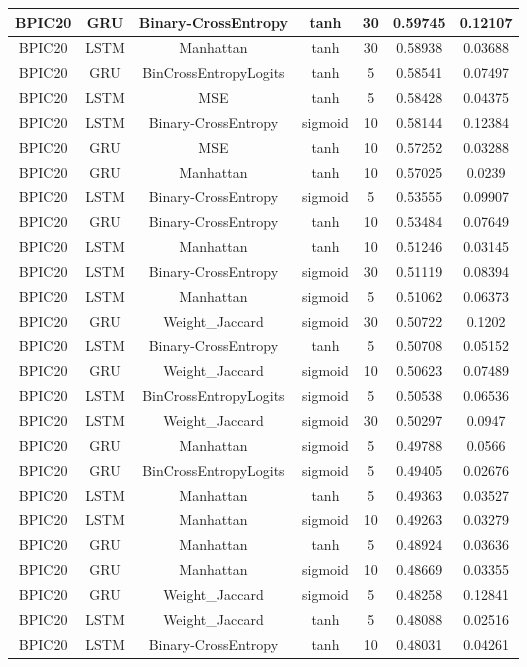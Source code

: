 \documentclass{article}%
\begin{document}
\begin{longtable}{|c|c|c|c|c|c|c|}
\hline%
BPIC20&GRU&Binary{-}CrossEntropy&tanh&30&0.59745&0.12107\\%
\hline%
BPIC20&LSTM&Manhattan&tanh&30&0.58938&0.03688\\%
\hline%
BPIC20&GRU&BinCrossEntropyLogits&tanh&5&0.58541&0.07497\\%
\hline%
BPIC20&LSTM&MSE&tanh&5&0.58428&0.04375\\%
\hline%
BPIC20&LSTM&Binary{-}CrossEntropy&sigmoid&10&0.58144&0.12384\\%
\hline%
BPIC20&GRU&MSE&tanh&10&0.57252&0.03288\\%
\hline%
BPIC20&GRU&Manhattan&tanh&10&0.57025&0.0239\\%
\hline%
BPIC20&LSTM&Binary{-}CrossEntropy&sigmoid&5&0.53555&0.09907\\%
\hline%
BPIC20&GRU&Binary{-}CrossEntropy&tanh&10&0.53484&0.07649\\%
\hline%
BPIC20&LSTM&Manhattan&tanh&10&0.51246&0.03145\\%
\hline%
BPIC20&LSTM&Binary{-}CrossEntropy&sigmoid&30&0.51119&0.08394\\%
\hline%
BPIC20&LSTM&Manhattan&sigmoid&5&0.51062&0.06373\\%
\hline%
BPIC20&GRU&Weight\_Jaccard&sigmoid&30&0.50722&0.1202\\%
\hline%
BPIC20&LSTM&Binary{-}CrossEntropy&tanh&5&0.50708&0.05152\\%
\hline%
BPIC20&GRU&Weight\_Jaccard&sigmoid&10&0.50623&0.07489\\%
\hline%
BPIC20&LSTM&BinCrossEntropyLogits&sigmoid&5&0.50538&0.06536\\%
\hline%
BPIC20&LSTM&Weight\_Jaccard&sigmoid&30&0.50297&0.0947\\%
\hline%
BPIC20&GRU&Manhattan&sigmoid&5&0.49788&0.0566\\%
\hline%
BPIC20&GRU&BinCrossEntropyLogits&sigmoid&5&0.49405&0.02676\\%
\hline%
BPIC20&LSTM&Manhattan&tanh&5&0.49363&0.03527\\%
\hline%
BPIC20&LSTM&Manhattan&sigmoid&10&0.49263&0.03279\\%
\hline%
BPIC20&GRU&Manhattan&tanh&5&0.48924&0.03636\\%
\hline%
BPIC20&GRU&Manhattan&sigmoid&10&0.48669&0.03355\\%
\hline%
BPIC20&GRU&Weight\_Jaccard&sigmoid&5&0.48258&0.12841\\%
\hline%
BPIC20&LSTM&Weight\_Jaccard&tanh&5&0.48088&0.02516\\%
\hline%
BPIC20&LSTM&Binary{-}CrossEntropy&tanh&10&0.48031&0.04261\\%

\end{longtable}
\end{document}
